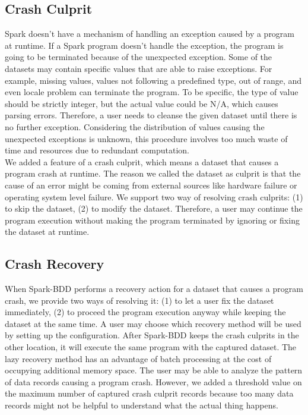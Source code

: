 \documentclass{acm_proc_article-sp}
\begin{document}
\subsection{Crash Culprit}

Spark doesn't have a mechanism of handling an exception caused by a program at runtime. If a Spark program doesn't handle the exception, the program is going to be terminated because of the unexpected exception. Some of the datasets may contain specific values that are able to raise exceptions. For example, missing values, values not following a predefined type, out of range, and even locale problem can terminate the program. To be specific, the type of value should be strictly integer, but the actual value could be N/A, which causes parsing errors. Therefore, a user needs to cleanse the given dataset until there is no further exception. Considering the distribution of values causing the unexpected exceptions is unknown, this procedure involves too much waste of time and resources due to redundant computation.\\
We added a feature of a crash culprit, which means a dataset that causes a program crash at runtime. The reason we called the dataset as culprit is that the cause of an error might be coming from external sources like hardware failure or operating system level failure. We support two way of resolving crash culprits: (1) to skip the dataset, (2) to modify the dataset. Therefore, a user may continue the program execution without making the program terminated by ignoring or fixing the dataset at runtime.

\subsection{Crash Recovery}

When Spark-BDD performs a recovery action for a dataset that causes a program crash, we provide two ways of resolving it: (1) to let a user fix the dataset immediately, (2) to proceed the program execution anyway while keeping the dataset at the same time. A user may choose which recovery method will be used by setting up the configuration. After Spark-BDD keeps the crash culprits in the other location, it will execute the same program with the captured dataset. The lazy recovery method has an advantage of batch processing at the cost of occupying additional memory space. The user may be able to analyze the pattern of data records causing a program crash. However, we added a threshold value on the maximum number of captured crash culprit records because too many data records might not be helpful to understand what the actual thing happens.
\end{document}
